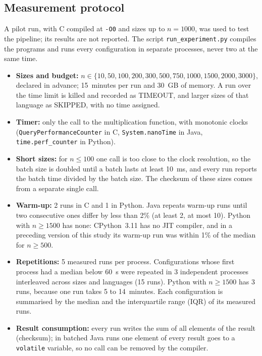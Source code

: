 \documentclass[12pt,a4paper]{article}
\begin{document}
\subsection{Measurement protocol}

A pilot run, with C compiled at \texttt{-O0} and sizes up to $n = 1000$, was used to test
the pipeline; its results are not reported. The script \texttt{run\_experiment.py}
compiles the programs and runs every configuration in separate processes, never two at
the same time.
\begin{itemize}
    \item \textbf{Sizes and budget:} $n \in \{10, 50, 100, 200, 300, 500, 750, 1000,
    1500, 2000, 3000\}$, declared in advance; 15~minutes per run and 30~GB of memory. A
    run over the time limit is killed and recorded as TIMEOUT, and larger sizes of that
    language as SKIPPED, with no time assigned.
    \item \textbf{Timer:} only the call to the multiplication function, with monotonic
    clocks (\texttt{QueryPerformanceCounter} in C, \texttt{System.nanoTime} in Java,
    \texttt{time.perf\_counter} in Python).
    \item \textbf{Short sizes:} for $n \le 100$ one call is too close to the clock
    resolution, so the batch size is doubled until a batch lasts at least 10~ms, and every
    run reports the batch time divided by the batch size. The checksum of these sizes comes
    from a separate single call.
    \item \textbf{Warm-up:} 2 runs in C and 1 in Python. Java repeats warm-up runs until
    two consecutive ones differ by less than 2\% (at least 2, at most 10). Python with
    $n \ge 1500$ has none: CPython~3.11 has no JIT compiler, and in a preceding version of
    this study its warm-up run was within 1\% of the median for $n \ge 500$.
    \item \textbf{Repetitions:} 5 measured runs per process. Configurations whose first
    process had a median below 60~s were repeated in 3 independent processes interleaved
    across sizes and languages (15 runs). Python with $n \ge 1500$ has 3 runs, because one
    run takes 5 to 14~minutes. Each configuration is summarised by the median and the
    interquartile range (IQR) of its measured runs.
    \item \textbf{Result consumption:} every run writes the sum of all elements of the
    result (checksum); in batched Java runs one element of every result goes to a
    \texttt{volatile} variable, so no call can be removed by the compiler.
\end{itemize}
\end{document}
